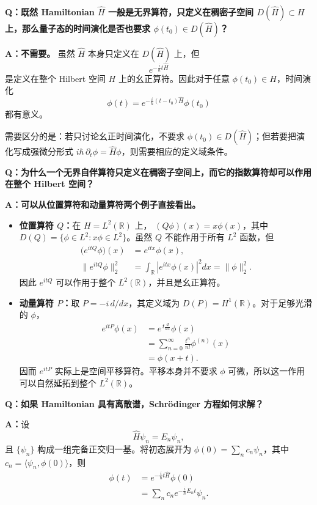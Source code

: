 \documentclass[UTF8,a4paper,11pt,openany]{ctexbook}
\begin{document}
\textbf{Q：既然 Hamiltonian $\hat H$ 一般是无界算符，只定义在稠密子空间
$D(\hat H)\subset H$ 上，那么量子态的时间演化是否也要求
$\phi(t_0)\in D(\hat H)$？}

\textbf{A：不需要。} 虽然 $\hat H$ 本身只定义在 $D(\hat H)$ 上，但
\[
e^{-\frac{i}{\hbar}t\hat H}
\]
是定义在整个 Hilbert 空间 $H$ 上的幺正算符。因此对于任意
$\phi(t_0)\in H$，时间演化
\[
\phi(t)
=
e^{-\frac{i}{\hbar}(t-t_0)\hat H}\phi(t_0)
\]
都有意义。

需要区分的是：若只讨论幺正时间演化，不要求
$\phi(t_0)\in D(\hat H)$；但若要把演化写成强微分形式
$i\hbar\,\partial_t\phi=\hat H\phi$，则需要相应的定义域条件。

\textbf{Q：为什么一个无界自伴算符只定义在稠密子空间上，而它的指数算符却可以作用在整个 Hilbert 空间？}

\textbf{A：可以从位置算符和动量算符两个例子直接看出。}

\begin{itemize}
    \item \textbf{位置算符 $Q$：}在 $H=L^2(\mathbb R)$ 上，
    $(Q\phi)(x)=x\phi(x)$，其中
    $D(Q)=\{\phi\in L^2:x\phi\in L^2\}$。虽然 $Q$ 不能作用于所有
    $L^2$ 函数，但
    \begin{align}
        \bigl(e^{itQ}\phi\bigr)(x)
        &=e^{itx}\phi(x),
        \nonumber\\
        \|e^{itQ}\phi\|_2^2
        &=
        \int_{\mathbb R}|e^{itx}\phi(x)|^2dx
        =
        \|\phi\|_2^2.
    \end{align}
    因此 $e^{itQ}$ 可以作用于整个 $L^2(\mathbb R)$，并且是幺正算符。

    \item \textbf{动量算符 $P$：}取
    $P=-i\,d/dx$，其定义域为 $D(P)=H^1(\mathbb R)$。对于足够光滑的
    $\phi$，
    \begin{align}
        e^{itP}\phi(x)
        &=
        e^{\,t\frac{d}{dx}}\phi(x)
        \nonumber\\
        &=
        \sum_{n=0}^{\infty}
        \frac{t^n}{n!}\phi^{(n)}(x)
        \nonumber\\
        &=
        \phi(x+t).
    \end{align}
    因而 $e^{itP}$ 实际上是空间平移算符。平移本身并不要求
    $\phi$ 可微，所以这一作用可以自然延拓到整个 $L^2(\mathbb R)$。
\end{itemize}

\textbf{Q：如果 Hamiltonian 具有离散谱，Schrödinger 方程如何求解？}

\textbf{A：}设
\[
\hat H\psi_n=E_n\psi_n,
\]
且 $\{\psi_n\}$ 构成一组完备正交归一基。将初态展开为
$\phi(0)=\sum_n c_n\psi_n$，其中
$c_n=\langle\psi_n,\phi(0)\rangle$，则
\begin{align}
    \phi(t)
    &=
    e^{-\frac{i}{\hbar}t\hat H}\phi(0)
    \nonumber\\
    &=
    \sum_n
    c_n
    e^{-\frac{i}{\hbar}E_nt}
    \psi_n.
\end{align}
\end{document}
